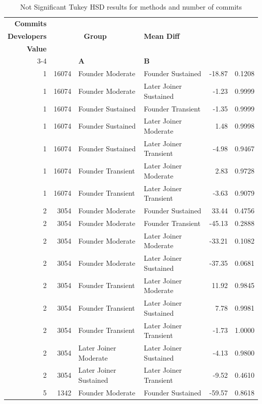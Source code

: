 \begin{table}[H]
\centering
\setlength{\tabcolsep}{2pt}
\caption[Not Significant Tukey HSD Results for methods]{Not Significant Tukey HSD results for methods and number of commits}
\begin{tabular}{r r l l r r}
\toprule
\textbf{Commits} & \makecell[t]{\textbf{Number of}\\\textbf{Developers}} & \multicolumn{2}{c}{\textbf{Group}} & \textbf{Mean Diff} & \makecell[t]{\textbf{Adj $P$}\\\textbf{Value}} \\ 
\cmidrule(lr){3-4}
 &  & \textbf{A} & \textbf{B} &  &  \\ 
\midrule
1 & 16074 & Founder Moderate & Founder Sustained & -18.87 & 0.1208 \\ 
1 & 16074 & Founder Moderate & Later Joiner Sustained & -1.23 & 0.9999 \\ 
1 & 16074 & Founder Sustained & Founder Transient & -1.35 & 0.9999 \\ 
1 & 16074 & Founder Sustained & Later Joiner Moderate & 1.48 & 0.9998 \\ 
1 & 16074 & Founder Sustained & Later Joiner Transient & -4.98 & 0.9467 \\ 
1 & 16074 & Founder Transient & Later Joiner Moderate & 2.83 & 0.9728 \\ 
1 & 16074 & Founder Transient & Later Joiner Transient & -3.63 & 0.9079 \\ 
2 & 3054 & Founder Moderate & Founder Sustained & 33.44 & 0.4756 \\ 
2 & 3054 & Founder Moderate & Founder Transient & -45.13 & 0.2888 \\ 
2 & 3054 & Founder Moderate & Later Joiner Moderate & -33.21 & 0.1082 \\ 
2 & 3054 & Founder Moderate & Later Joiner Sustained & -37.35 & 0.0681 \\ 
2 & 3054 & Founder Transient & Later Joiner Moderate & 11.92 & 0.9845 \\ 
2 & 3054 & Founder Transient & Later Joiner Sustained & 7.78 & 0.9981 \\ 
2 & 3054 & Founder Transient & Later Joiner Transient & -1.73 & 1.0000 \\ 
2 & 3054 & Later Joiner Moderate & Later Joiner Sustained & -4.13 & 0.9800 \\ 
2 & 3054 & Later Joiner Sustained & Later Joiner Transient & -9.52 & 0.4610 \\ 
5 & 1342 & Founder Moderate & Founder Sustained & -59.57 & 0.8618 \\ 

\end{tabular}
\end{table}
